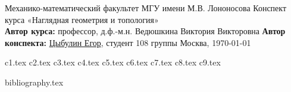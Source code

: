 \documentclass[a4paper, 12pt]{article}
\theoremstyle{plain}
\theoremstyle{definition}
\theoremstyle{remark}
\begin{document}
\begin{titlepage}
    \begin{center}
        \large Механико-математический факультет МГУ имени М.В. Лононосова
        \vfill
        \Large Конспект курса «Наглядная геометрия и топология» \bigskip \\
        \large \textbf{Автор курса:} профессор, д.ф.-м.н. Ведюшкина Виктория Викторовна
        \textbf{Автор конспекта:} \href{https://github.com/betel-git}{Цыбулин Егор}, студент 108 группы
        \vfill
        Москва, \today
    \end{center}
\end{titlepage}
\tableofcontents
\newpage

\fontsize{14pt}{20pt}\selectfont

{c1.tex}
{c2.tex}
\newpage
{c3.tex}
{c4.tex}
{c5.tex}
{c6.tex}
{c7.tex}
{c8.tex}
{c9.tex}

\newpage
{bibliography.tex}
\end{document}

